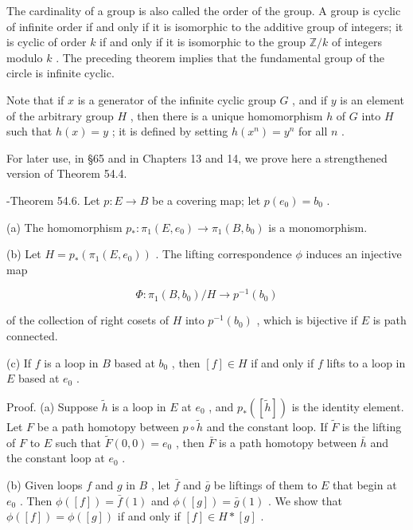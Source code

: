 The cardinality of a group is also called the order of the group. A group is cyclic of infinite order if and only if it is isomorphic to the additive group of integers; it is cyclic of order \(k\) if and only if it is isomorphic to the group \(\mathbb{Z}/k\) of integers modulo \(k\) . The preceding theorem implies that the fundamental group of the circle is infinite cyclic.

Note that if \(x\) is a generator of the infinite cyclic group \(G\) , and if \(y\) is an element of the arbitrary group \(H\) , then there is a unique homomorphism \(h\) of \(G\) into \(H\) such that \(h\left( x\right)  = y\) ; it is defined by setting \(h\left( {x}^{n}\right)  = {y}^{n}\) for all \(n\) .

For later use, in §65 and in Chapters 13 and 14, we prove here a strengthened version of Theorem 54.4.

-Theorem 54.6. Let \(p : E \rightarrow  B\) be a covering map; let \(p\left( {e}_{0}\right)  = {b}_{0}\) .

(a) The homomorphism \({p}_{ * } : {\pi }_{1}\left( {E,{e}_{0}}\right)  \rightarrow  {\pi }_{1}\left( {B,{b}_{0}}\right)\) is a monomorphism.

(b) Let \(H = {p}_{ * }\left( {{\pi }_{1}\left( {E,{e}_{0}}\right) }\right)\) . The lifting correspondence \(\phi\) induces an injective map

\[
\Phi  : {\pi }_{1}\left( {B,{b}_{0}}\right) /H \rightarrow  {p}^{-1}\left( {b}_{0}\right)
\]

of the collection of right cosets of \(H\) into \({p}^{-1}\left( {b}_{0}\right)\) , which is bijective if \(E\) is path connected.

(c) If \(f\) is a loop in \(B\) based at \({b}_{0}\) , then \(\left\lbrack  f\right\rbrack   \in  H\) if and only if \(f\) lifts to a loop in \(E\) based at \({e}_{0}\) .

Proof. (a) Suppose \(\widetilde{h}\) is a loop in \(E\) at \({e}_{0}\) , and \({p}_{ * }\left( \left\lbrack  \widetilde{h}\right\rbrack  \right)\) is the identity element. Let \(F\) be a path homotopy between \(p \circ  \widetilde{h}\) and the constant loop. If \(\widetilde{F}\) is the lifting of \(F\) to \(E\) such that \(\widetilde{F}\left( {0,0}\right)  = {e}_{0}\) , then \(\bar{F}\) is a path homotopy between \(\bar{h}\) and the constant loop at \({e}_{0}\) .

(b) Given loops \(f\) and \(g\) in \(B\) , let \(\bar{f}\) and \(\bar{g}\) be liftings of them to \(E\) that begin at \({e}_{0}\) . Then \(\phi \left( \left\lbrack  f\right\rbrack  \right)  = \bar{f}\left( 1\right)\) and \(\phi \left( \left\lbrack  g\right\rbrack  \right)  = \bar{g}\left( 1\right)\) . We show that \(\phi \left( \left\lbrack  f\right\rbrack  \right)  = \phi \left( \left\lbrack  g\right\rbrack  \right)\) if and only if \(\left\lbrack  f\right\rbrack   \in  H * \left\lbrack  g\right\rbrack\) .

